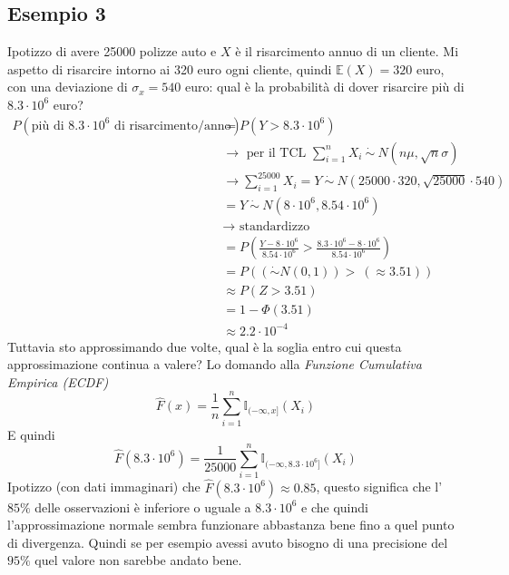 \documentclass[11pt]{report}
\begin{document}
\subsection{Esempio 3}
Ipotizzo di avere 25000 polizze auto e $X$ è il risarcimento annuo di un cliente. Mi aspetto di risarcire intorno ai 320 euro ogni cliente, quindi $\mathbb{E}(X) = 320$ euro, con una deviazione di $\sigma_x = 540$ euro: qual è la probabilità di dover risarcire più di $8.3 \cdot 10^6$ euro?
\begin{equation}
    \begin{split}
        P(\text{più di } 8.3 \cdot 10^6 \text{ di risarcimento/anno})& = P(Y > 8.3 \cdot 10^6)\\
        & \rightarrow \text{ per il TCL } \sum^n_{i=1} X_i\ \dot\sim\ N \left(n\mu,\sqrt{n}\sigma \right)\\
        & \rightarrow \sum_{i=1}^{25000} X_i = Y\ \dot\sim\ N \left(25000 \cdot 320, \sqrt{25000} \cdot 540 \right)\\
        & = Y\ \dot\sim\ N(8 \cdot 10^6, 8.54 \cdot 10^6)\\
        & \rightarrow \text{ standardizzo}\\
        & = P \left( \frac{Y - 8 \cdot 10^6}{8.54 \cdot 10^6} > \frac{8.3 \cdot 10^6 - 8 \cdot 10^6}{8.54 \cdot 10^6} \right)\\
        & = P \left( \left( \dot\sim N(0,1) \right) >\ \left( \approx 3.51 \right) \right)\\
        & \approx P(Z > 3.51)\\
        & = 1 - \Phi(3.51)\\
        & \approx 2.2 \cdot 10^{-4}
    \end{split}
\end{equation}
Tuttavia sto approssimando due volte, qual è la soglia entro cui questa approssimazione continua a valere? Lo domando alla \textit{Funzione Cumulativa Empirica (ECDF)}
\begin{equation}
	\hat{F}(x) = \frac{1}{n} \sum_{i=1}^n \mathbb{I}_{(-\infty, x]}(X_i)
\end{equation}
E quindi
\begin{equation}
	\hat{F}(8.3 \cdot 10^6) = \frac{1}{25000} \sum_{i=1}^n \mathbb{I}_{(-\infty, 8.3 \cdot 10^6]}(X_i)
\end{equation}
Ipotizzo (con dati immaginari) che $\hat{F}(8.3 \cdot 10^6) \approx 0.85$, questo significa che l'$85\%$ delle osservazioni è inferiore o uguale a $8.3 \cdot 10^6$ e che quindi l'approssimazione normale sembra funzionare abbastanza bene fino a quel punto di divergenza. Quindi se per esempio avessi avuto bisogno di una precisione del $95\%$ quel valore non sarebbe andato bene.
\end{document}
